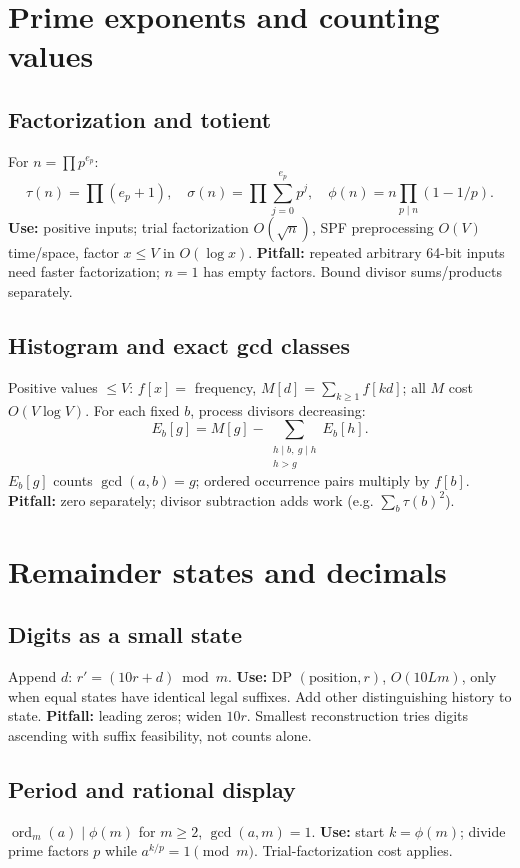 \section{Prime exponents and counting values}
\subsection{Factorization and totient}
For $n=\prod p^{e_p}$:
\[
\tau(n)=\prod(e_p+1),\quad \sigma(n)=\prod\sum_{j=0}^{e_p}p^j,
\quad\phi(n)=n\prod_{p\mid n}(1-1/p).
\]
\textbf{Use:} positive inputs; trial factorization $O(\sqrt n)$,
SPF preprocessing $O(V)$ time/space, factor $x\le V$ in $O(\log x)$.
\textbf{Pitfall:} repeated arbitrary 64-bit inputs need faster factorization;
$n=1$ has empty factors. Bound divisor sums/products separately.

\subsection{Histogram and exact gcd classes}
Positive values $\le V$: $f[x]=$ frequency,
$M[d]=\sum_{k\ge1}f[kd]$; all $M$ cost $O(V\log V)$.
For each fixed $b$, process divisors decreasing:
\[
E_b[g]=M[g]-\!\sum_{\substack{h\mid b,\ g\mid h\\h>g}}E_b[h].
\]
$E_b[g]$ counts $\gcd(a,b)=g$; ordered occurrence pairs multiply by $f[b]$.
\textbf{Pitfall:} zero separately; divisor subtraction adds work
(e.g. $\sum_b\tau(b)^2$).

\section{Remainder states and decimals}
\subsection{Digits as a small state}
Append $d$: $r'=(10r+d)\bmod m$.
\textbf{Use:} DP $(\mathrm{position},r)$, $O(10Lm)$, only when equal states
have identical legal suffixes. Add other distinguishing history to state.
\textbf{Pitfall:} leading zeros; widen $10r$. Smallest reconstruction tries
digits ascending with suffix feasibility, not counts alone.

\subsection{Period and rational display}
$\operatorname{ord}_m(a)\mid\phi(m)$ for $m\ge2$, $\gcd(a,m)=1$.
\textbf{Use:} start $k=\phi(m)$; divide prime factors $p$ while
$a^{k/p}=1\pmod m$. Trial-factorization cost applies.

